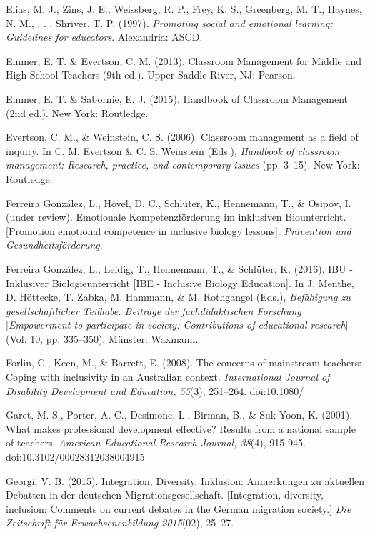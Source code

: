 \documentclass[11.5pt]{sig-alternate} %
\begin{document}
Elias, M. J., Zins, J. E., Weissberg, R. P., Frey, K. S., Greenberg, M. T., Haynes, N. M., . . . Shriver, T. P. (1997). \textit{Promoting social and emotional learning: Guidelines for educators}. Alexandria: ASCD.

Emmer, E. T. \& Evertson, C. M. (2013). Classroom Management for Middle and High School Teachers (9th ed.). Upper Saddle River, NJ: Pearson.

Emmer, E. T. \& Sabornie, E. J. (2015). Handbook of Classroom Management (2nd ed.). New York: Routledge.

Evertson, C. M., \& Weinstein, C. S. (2006). Classroom management as a field of inquiry. In C. M. Evertson \& C. S. Weinstein (Eds.), \textit{Handbook of classroom management: Research, practice, and contemporary issues} (pp. 3–15). New York: Routledge.

Ferreira González, L., Hövel, D. C., Schlüter, K., Hennemann, T., \& Osipov, I. (under review). Emotionale Kompetenzförderung im inklusiven Biounterricht. [Promotion emotional competence in inclusive biology lessons]. \textit{Prävention und Gesundheitsförderung}.

Ferreira González, L., Leidig, T., Hennemann, T., \& Schlüter, K. (2016). IBU - Inklusiver Biologieunterricht [IBE - Inclusive Biology Education]. In J. Menthe, D. Höttecke, T. Zabka, M. Hammann, \& M. Rothgangel (Eds.), \textit{Befähigung zu gesellschaftlicher Teilhabe. Beiträge der fachdidaktischen Forschung} [\textit{Empowerment to participate in society: Contributions of educational research}] (Vol. 10, pp. 335–350). Münster: Waxmann.

Forlin, C., Keen, M., \& Barrett, E. (2008). The concerns of mainstream teachers: Coping with inclusivity in an Australian context. \textit{International Journal of Disability Development and Education, 55}(3), 251–264. doi:10.1080/

Garet, M. S., Porter, A. C., Desimone, L., Birman, B., \& Suk Yoon, K. (2001). What makes professional development effective? Results from a national sample of teachers. \textit{American Educational Research Journal, 38}(4), 915-945. doi:10.3102/00028312038004915

Georgi, V. B. (2015). Integration, Diversity, Inklusion: Anmerkungen zu aktuellen Debatten in der deutschen Migrationsgesellschaft. [Integration, diversity, inclusion: Comments on current debates in the German migration society.] \textit{Die Zeitschrift für Erwachsenenbildung 2015}(02), 25–27.
\end{document}
